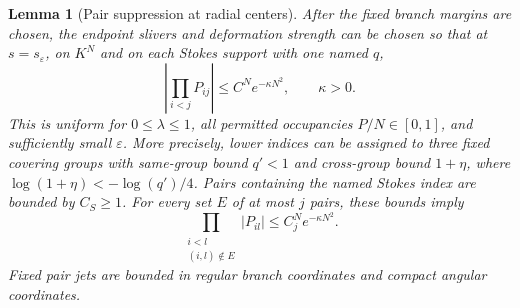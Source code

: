\documentclass[11pt]{article}
\numberwithin{equation}{section}
\newtheorem{lemma}[theorem]{Lemma}
\theoremstyle{definition}
\newcommand{\eps}{\varepsilon}
\begin{document}
\begin{lemma}[Pair suppression at radial centers]\label{lem:contraction}
After the fixed branch margins are chosen, the endpoint slivers and
deformation strength can be chosen so that at \(s=s_\eps\), on
\(K^N\) and on each Stokes support with one named \(q\),
\[
 \left|\prod_{i<j}P_{ij}\right|\le C^Ne^{-\kappa N^2},
 \qquad \kappa>0 .
\]
This is uniform for \(0\le\lambda\le1\), all permitted occupancies
\(P/N\in[0,1]\), and sufficiently small \(\eps\).
More precisely, lower indices can be assigned to three fixed
covering groups with same-group bound \(q'<1\) and cross-group
bound \(1+\eta\), where \(\log(1+\eta)<-\log(q')/4\).
Pairs containing the named Stokes index are bounded by \(C_S\ge1\).
For every set \(E\) of at most \(j\) pairs, these bounds imply
\[
 \prod_{\substack{i<l\\(i,l)\notin E}}|P_{il}|
       \le C_j^N e^{-\kappa N^2}.
\]
Fixed pair jets are bounded in regular branch coordinates and
compact angular coordinates.
\end{lemma}
\end{document}

